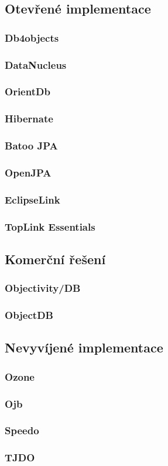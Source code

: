 \subsection{Otevřené implementace}
\subsubsection{Db4objects}
\subsubsection{DataNucleus}
\subsubsection{OrientDb}
\subsubsection{Hibernate}
\subsubsection{Batoo JPA}
\subsubsection{OpenJPA}
\subsubsection{EclipseLink}
\subsubsection{TopLink Essentials}
\subsection{Komerční řešení}
\subsubsection{Objectivity/DB}
\subsubsection{ObjectDB}
\subsection{Nevyvíjené implementace}
\subsubsection{Ozone}
\subsubsection{Ojb}
\subsubsection{Speedo}
\subsubsection{TJDO}
